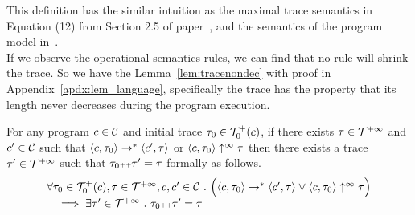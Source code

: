 %
This definition has the similar intuition as the maximal trace semantics in Equation (12) from Section 2.5 of paper~\cite{Cousot19a}, and the semantics of the program model in~\cite{SinnZV17}.
\\
If we observe the operational semantics rules, we can find that no rule will shrink the trace. 
So we have the Lemma~\ref{lem:tracenondec} with proof in Appendix~\ref{apdx:lem_language}, 
specifically the trace has the property that its length never decreases during the program execution.
\begin{lem}
  \label{lem:tracenondec}
  For any program $c \in \mathcal{C}$ and initial trace $\mathtt{\tau}_0 \in \mathcal{T}^{+}_0(c)$,
  if there exists $\mathtt{\tau} \in \mathcal{T}^{+\infty}$ and $c' \in \mathcal{C} $ such that $\langle c, \mathtt{\tau}_0 \rangle \rightarrow^{*} \langle c', \mathtt{\tau} \rangle $ or 
  $\langle c, \mathtt{\tau}_0 \rangle \uparrow^{\infty} \mathtt{\tau}$  
  then there exists a trace $\mathtt{\tau}' \in \mathcal{T}^{+\infty}$ such that $\mathtt{\tau}_0 {\scriptscriptstyle ++} \mathtt{\tau}' = \mathtt{\tau}$ formally as follows.
  \[
    \begin{array}{l}
    \forall \mathtt{\tau}_0 \in \mathcal{T}^{+}_0(c), \mathtt{\tau} \in \mathcal{T}^{+\infty}, c, c' \in \mathcal{C} ~.~
    \Big( \langle c, \mathtt{\tau}_0 \rangle \rightarrow^{*} \langle c', \mathtt{\tau} \rangle 
    \lor  \langle c, \mathtt{\tau}_0 \rangle \uparrow^{\infty} \mathtt{\tau} \Big)
    \\ \quad
    \implies \exists \mathtt{\tau}' \in \mathcal{T}^{+\infty} ~.~ \mathtt{\tau}_0 {\scriptscriptstyle ++} \mathtt{\tau}' = \mathtt{\tau} 
    \end{array}
    \]
  \end{lem}